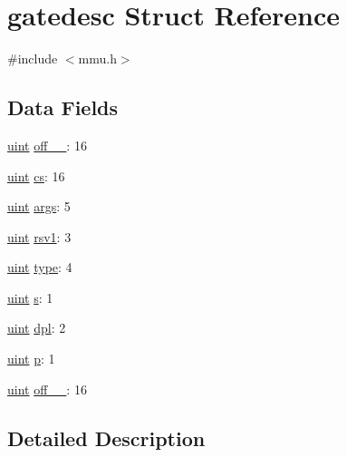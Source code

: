 \hypertarget{structgatedesc}{\section{gatedesc Struct Reference}
\label{structgatedesc}
}


{\ttfamily \#include $<$mmu.\-h$>$}

\subsection*{Data Fields}
\begin{DoxyCompactItemize}
\item 
\hyperlink{types_8h_a91ad9478d81a7aaf2593e8d9c3d06a14}{uint} \hyperlink{structgatedesc_a0bf2673f8a3b3345556cc583c08bfcbf}{off\-\_\-\_}\-: 16
\item 
\hyperlink{types_8h_a91ad9478d81a7aaf2593e8d9c3d06a14}{uint} \hyperlink{structgatedesc_a21ff1dca4ee9146feae362cb81bdb73b}{cs}\-: 16
\item 
\hyperlink{types_8h_a91ad9478d81a7aaf2593e8d9c3d06a14}{uint} \hyperlink{structgatedesc_a69a56280915744f111d56afba8b9bbe5}{args}\-: 5
\item 
\hyperlink{types_8h_a91ad9478d81a7aaf2593e8d9c3d06a14}{uint} \hyperlink{structgatedesc_a3c18a496ce0a34acbeb84338e3021797}{rsv1}\-: 3
\item 
\hyperlink{types_8h_a91ad9478d81a7aaf2593e8d9c3d06a14}{uint} \hyperlink{structgatedesc_a4e4020c6e82bee6562d5bc3c1657cafe}{type}\-: 4
\item 
\hyperlink{types_8h_a91ad9478d81a7aaf2593e8d9c3d06a14}{uint} \hyperlink{structgatedesc_a35181190d39e3d895c0ab657aceabb54}{s}\-: 1
\item 
\hyperlink{types_8h_a91ad9478d81a7aaf2593e8d9c3d06a14}{uint} \hyperlink{structgatedesc_af007c16108fee6bd537fac7128283b6e}{dpl}\-: 2
\item 
\hyperlink{types_8h_a91ad9478d81a7aaf2593e8d9c3d06a14}{uint} \hyperlink{structgatedesc_afca19e8f7fcc079e05083a7012c34ccf}{p}\-: 1
\item 
\hyperlink{types_8h_a91ad9478d81a7aaf2593e8d9c3d06a14}{uint} \hyperlink{structgatedesc_acda895cddc31853ba2be2ca38f9fc106}{off\-\_\-\_}\-: 16
\end{DoxyCompactItemize}


\subsection{Detailed Description}


